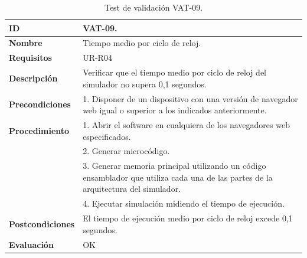 \begin{center}
\begin{table}[htb]
\centering
\caption{Test de validación VAT-09.}
\begin{tabular}{@{}p{2.5cm} p{9cm}@{}} 
\toprule
\textbf{ID} 					& VAT-09. \\
\midrule
\textbf{Nombre} 				& Tiempo medio por ciclo de reloj. \\
\midrule
\textbf{Requisitos} 		& UR-R04\\
\midrule
\textbf{Descripción} 		& Verificar que el tiempo medio por ciclo de reloj del simulador no supera 0,1 segundos. \\
\midrule
\textbf{Precondiciones}		& 1. Disponer de un dispositivo con una versión de navegador web igual o superior a los indicados anteriormente. \\
\midrule
\textbf{Procedimiento}			& 1. Abrir el software en cualquiera de los navegadores web especificados. \\
							& 2. Generar microcódigo.\\
							& 3. Generar memoria principal utilizando un código ensamblador que utiliza cada una de las partes de la arquitectura del simulador.\\
							& 4. Ejecutar simulación midiendo el tiempo de ejecución.\\
\midrule
\textbf{Postcondiciones} 		&  El tiempo de ejecución medio por ciclo de reloj excede 0,1 segundos.\\
\midrule
\textbf{Evaluación} 			& OK \\
\bottomrule
\end{tabular}
\label{tab:vat-09}
\end{table}
\end{center}

